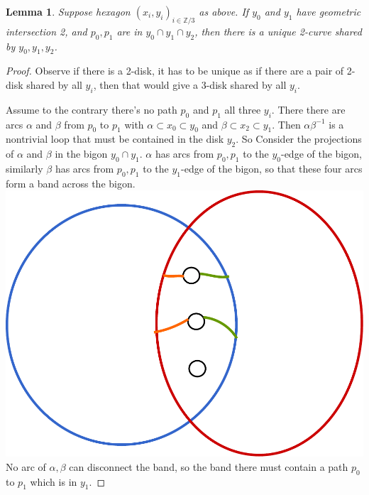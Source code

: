 \documentclass[11pt]{article}
\newcommand{\Z}{\mathbb{Z}}
\newtheorem{lemma}[theorem]{Lemma}
\theoremstyle{remark}
\theoremstyle{definition}
\begin{document}
\begin{lemma}
  Suppose hexagon $(x_i,y_i)_{i \in \Z/3}$ as above.
  If $y_0$ and $y_1$ have geometric intersection 2,
  and $p_0, p_1$ are in $y_0 \cap y_1 \cap y_2$,
  then there is a unique 2-curve shared by $y_0,y_1,y_2$.
\end{lemma}
\begin{proof}
  Observe if there is a 2-disk, it has to be unique as
  if there are a pair of 2-disk shared by all $y_i$,
  then that would give a 3-disk shared by all $y_i$.

  Assume to the contrary there's no path
   $p_0$ and $p_1$ all three $y_i$.
   There there are arcs $\alpha$ and $\beta$
   from $p_0$ to $p_1$ with $\alpha \subset x_0\subset y_0$
   and $\beta \subset x_2 \subset y_1$.
   Then $\alpha\beta^{-1}$ is a nontrivial loop that must be contained in the disk $y_2$.
   So
   Consider the projections of $\alpha$ and $\beta$ in the bigon $y_0 \cap y_1$.
   $\alpha$ has arcs from $p_0,p_1$ to the $y_0$-edge of the bigon,
   similarly
   $\beta$ has arcs from $p_0,p_1$ to the $y_1$-edge of the bigon,
   so that these four arcs form a band across the bigon.
  \includegraphics[width=.2\textwidth]{figures/2curveinbigon.pdf}
  No arc of $\alpha,\beta$ can disconnect the band, so the band
  there must contain a path $p_0$ to $p_1$ which is in $y_1$.

\end{proof}
\end{document}
